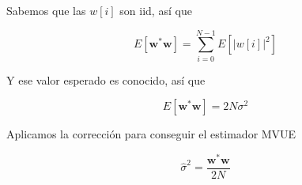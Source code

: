 Sabemos que las $w[i]$ son iid, así que 

\begin{equation}
    E\left[\mathbf{w}^\ast\mathbf{w}\right] =     \sum_{i=0}^{N-1}E\left[\lvert w[i]\rvert^2\right] 
\end{equation}

Y ese valor esperado es conocido, así que

\begin{equation}
    E\left[\mathbf{w}^\ast\mathbf{w}\right] =  2N\sigma^2
\end{equation}

Aplicamos la corrección para conseguir el estimador MVUE

\begin{equation}
    \hat{\sigma}^2 = \frac{\mathbf{w}^\ast\mathbf{w}}{2N}
\end{equation}


